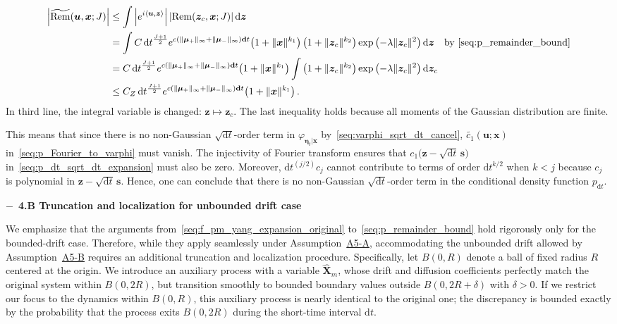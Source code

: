 \documentclass[
 longbibliography,
 twocolumn,
 superscriptaddress,
 amsmath,
 amssymb,
 amsthm,
 amsfonts,
 prl,
 floatfix,
]{revtex4-2}
\begin{document}
\begin{widetext}
\begin{equation*}
\begin{aligned}
    \left|\widetilde{\mathrm{Rem}}(\bm u,\bm x;J)\right|
    &\leq\int\left|e^{i\langle\bm u,\bm z\rangle}\right|
    \left|\mathrm{Rem}\!\left(\bm z_c,\bm x;J\right)\right|\mathrm d\bm z
    \\
    &=\int C\,\mathrm dt^{\frac{J+1}{2}}
    e^{c\left(\|\bm\mu_+\|_\infty+\|\bm\mu_-\|_\infty\right)\mathbf dt}
    \!\left(1+\|\bm x\|^{k_1}\right)
    \big(1+\|\bm z_c\|^{k_2}\big)
    \exp\left(-\lambda\|\bm z_c\|^2\right)\mathrm d\bm z
    \quad\text{by~\eqref{seq:p_remainder_bound}}
    \\
    &=C\,\mathrm dt^{\frac{J+1}{2}}
    e^{c\left(\|\bm\mu_+\|_\infty+\|\bm\mu_-\|_\infty\right)\mathbf dt}
    \!\left(1+\|\bm x\|^{k_1}\right)
    \int\big(1+\|\bm z_c\|^{k_2}\big)\exp\left(-\lambda\|\bm z_c\|^2\right)\mathrm d\bm z_c
    \\
    &\leq C_Z\,\mathrm dt^{\frac{J+1}{2}}
    e^{c\left(\|\bm\mu_+\|_\infty+\|\bm\mu_-\|_\infty\right)\mathbf dt}
    \!\left(1+\|\bm x\|^{k_1}\right).
\end{aligned}
\end{equation*}
In third line, the integral variable is changed: $\bm z\mapsto\bm z_c$.
The last inequality holds because all moments of the Gaussian distribution are finite.

This means that since there is no non-Gaussian $\sqrt{\mathrm dt}$-order term in $\varphi_{\bm\eta_t|\bm x}$ by~\eqref{seq:varphi_sqrt_dt_cancel}, $\widetilde{c_1}(\bm u;\bm x)$ in~\eqref{seq:p_Fourier_to_varphi} must vanish. The injectivity of Fourier transform ensures that $c_1\big(\bm z-\sqrt{\mathrm dt}\,\bm s\big)$ in~\eqref{seq:p_dt_sqrt_dt_expansion} must also be zero. Moreover, $\mathrm dt^{(j/2)}c_j$ cannot contribute to terms of order $\mathrm dt^{k/2}$ when $k<j$ because $c_j$ is polynomial in $\bm z-\sqrt{\mathrm dt}\,\bm s$. Hence, one can conclude that there is no non-Gaussian $\sqrt{\mathrm dt}$-order term in the conditional density function $p_{\mathrm dt}$. 

\medskip
\noindent$-$\ \textbf{4.B Truncation and localization for unbounded drift case} 

We emphasize that the arguments from~\eqref{seq:f_pm_yang_expansion_original} to~\eqref{seq:p_remainder_bound} hold rigorously only for the bounded-drift case. Therefore, while they apply seamlessly under Assumption~\hyperlink{assumption:A5-A}{A5-A}, accommodating the unbounded drift allowed by Assumption~\hyperlink{assumption:A5-B}{A5-B} requires an additional truncation and localization procedure. 
Specifically, let $B(0,R)$ denote a ball of fixed radius $R$ centered at the origin. We introduce an auxiliary process with a variable $\hat{\bm X}_m$, whose drift and diffusion coefficients perfectly match the original system within $B(0,2R)$, but transition smoothly to bounded boundary values outside $B(0,2R+\delta)$ with $\delta>0$. If we restrict our focus to the dynamics within $B(0,R)$, this auxiliary process is nearly identical to the original one; the discrepancy is bounded exactly by the probability that the process exits $B(0,2R)$ during the short-time interval $\mathrm dt$. 


\end{widetext}
\end{document}
